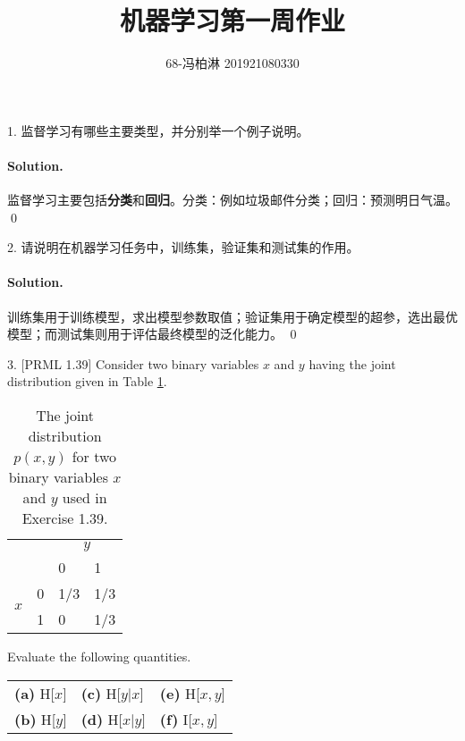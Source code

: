 \documentclass[a4paper, utf8]{ctexart}
\title{机器学习第一周作业}
\author{68-冯柏淋 201921080330}
\date{}
\newenvironment{solution}
{\color{blue} \paragraph{Solution.}}
{\newline \qed}
\begin{document}
\maketitle

1. 监督学习有哪些主要类型，并分别举一个例子说明。
\begin{solution}
    监督学习主要包括\textbf{分类}和\textbf{回归}。分类：例如垃圾邮件分类；回归：预测明日气温。
\end{solution}

2. 请说明在机器学习任务中，训练集，验证集和测试集的作用。
\begin{solution}
    训练集用于训练模型，求出模型参数取值；验证集用于确定模型的超参，选出最优模型；而测试集则用于评估最终模型的泛化能力。
\end{solution}

3. {\color{red} [PRML 1.39]} Consider two binary variables $x$ and $y$ having the joint distribution given in Table \ref{tab:t1}.

\begin{table}[!h]
\begin{center}
\begin{tabular}{llll}
                                       &                                & \multicolumn{2}{c}{$y$}                               \\ 
\multicolumn{1}{l}{}                   & \multicolumn{1}{l|}{\textbf{}} & \multicolumn{1}{l}{0}   & \multicolumn{1}{l}{1}   \\ \cline{2-4} 
\multicolumn{1}{l}{\multirow{2}{*}{$x$}} & \multicolumn{1}{l|}{0}         & \multicolumn{1}{l}{1/3} & \multicolumn{1}{l}{1/3} \\ 
\multicolumn{1}{l}{}                   & \multicolumn{1}{l|}{1}         & \multicolumn{1}{l}{0}   & \multicolumn{1}{l}{1/3} \\ 
\end{tabular}
\caption{The joint distribution $p(x, y)$ for two binary variables $x$ and $y$ used in Exercise 1.39.} \label{tab:t1}
\end{center}
\end{table}

Evaluate the following quantities.
\begin{table}[!h]
\begin{center}
\begin{tabular}{C{1.75in} C{1.75in} C{1.75in}}
\textbf{(a)} H{[}$ x ${]} & \textbf{(c)} H{[}$ y | x${]} & \textbf{(e)} H{[}$x, y ${]} \\
\textbf{(b)} H{[}$ y ${]} & \textbf{(d)} H{[}$x | y ${]} & \textbf{(f)} I{[}$x, y ${]}
\end{tabular}
\end{center}
\end{table}
\end{document}

